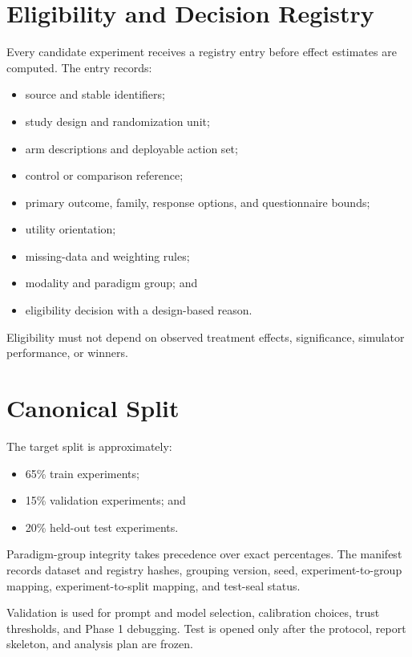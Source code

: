 \documentclass[11pt]{article}
\begin{document}
\section{Eligibility and Decision Registry}

Every candidate experiment receives a registry entry before effect estimates are computed. The entry records:

\begin{itemize}
\item source and stable identifiers;
\item study design and randomization unit;
\item arm descriptions and deployable action set;
\item control or comparison reference;
\item primary outcome, family, response options, and questionnaire bounds;
\item utility orientation;
\item missing-data and weighting rules;
\item modality and paradigm group; and
\item eligibility decision with a design-based reason.
\end{itemize}

Eligibility must not depend on observed treatment effects, significance, simulator performance, or winners.

\section{Canonical Split}

The target split is approximately:

\begin{itemize}
\item 65\% train experiments;
\item 15\% validation experiments; and
\item 20\% held-out test experiments.
\end{itemize}

Paradigm-group integrity takes precedence over exact percentages. The manifest records dataset and registry hashes, grouping version, seed, experiment-to-group mapping, experiment-to-split mapping, and test-seal status.

Validation is used for prompt and model selection, calibration choices, trust thresholds, and Phase 1 debugging. Test is opened only after the protocol, report skeleton, and analysis plan are frozen.
\end{document}
